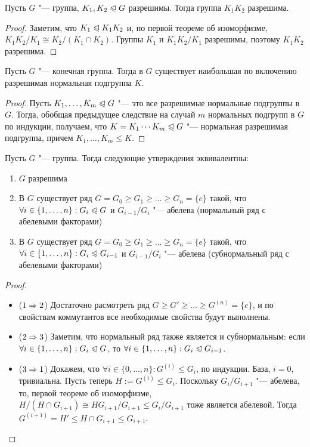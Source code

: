 \begin{corollary}
	Пусть $G$ "--- группа, $K_1, K_2 \trianglelefteqslant G$ разрешимы. Тогда группа $K_1K_2$ разрешима.
\end{corollary}

\begin{proof}
	Заметим, что $K_1 \trianglelefteqslant K_1K_2$ и, по первой теореме об изоморфизме, $K_1K_2/K_1 \cong K_2/(K_1 \cap K_2)$. Группы $K_1$ и $K_1K_2 / K_1$ разрешимы, поэтому $K_1K_2$ разрешима.
\end{proof}

\begin{corollary}
	Пусть $G$ "--- конечная группа. Тогда в $G$ существует наибольшая по включению разрешимая нормальная подгруппа $K$.
\end{corollary}

\begin{proof}
	Пусть $K_1, \dotsc, K_m \trianglelefteqslant G$ "--- это все разрешимые нормальные подгруппы в $G$. Тогда, обобщая предыдущее следствие на случай $m$ нормальных подгрупп в $G$ по индукции, получаем, что $K = K_1\dotsm K_m \trianglelefteqslant G$ "--- нормальная разрешимая подгруппа, причем $K_1, \dotsc, K_m \le K$.
\end{proof}

\begin{theorem}
	Пусть $G$ "--- группа. Тогда следующие утверждения эквивалентны:
	\begin{enumerate}
		\item $G$ разрешима
		\item В $G$ существует ряд $G = G_0 \ge G_1 \ge \dotsc \ge G_n = \{e\}$ такой, что $\forall i \in \{1, \dotsc, n\}: G_i \trianglelefteqslant G$ и $G_{i-1}/G_i$ "--- абелева (нормальный ряд с абелевыми факторами)
		\item В $G$ существует ряд $G = G_0 \ge G_1 \ge \dotsc \ge G_n = \{e\}$ такой, что $\forall i \in \{1, \dotsc, n\}: G_i \trianglelefteqslant G_{i-1}$ и $G_{i-1}/G_i$ "--- абелева (субнормальный ряд с абелевыми факторами)
	\end{enumerate}
\end{theorem}

\begin{proof}~
	\begin{itemize}
		\item ($1 \Rightarrow 2$) Достаточно расмотреть ряд $G \ge G' \ge \dotsc \ge G^{(n)} = \{e\}$, и по свойствам коммутантов все необходимые свойства будут выполнены.
		\item ($2 \Rightarrow 3$) Заметим, что нормальный ряд также является и субнормальным: если $\forall i \hm\in \{1, \dotsc, n\}: G_i \normal G$, то $\forall i \in \{1, \dotsc, n\}: G_i \trianglelefteqslant G_{i-1}$.
		\item ($3 \Rightarrow 1$) Докажем, что $\forall i \in \{0, \dotsc, n\}: G^{(i)} \le G_i$, по индукции. База, $i = 0$, тривиальна. Пусть теперь $H := G^{(i)} \le G_i$. Поскольку $G_i / G_{i+1}$ "--- абелева, то, первой теореме об изоморфизме, $H/(H \cap G_{i+1}) \cong HG_{i+1}/G_{i+1} \le G_i/G_{i+1}$ тоже является абелевой. Тогда $G^{(i+1)} = H' \le H \cap G_{i+1} \le G_{i+1}$.
	\end{itemize}
\end{proof}

